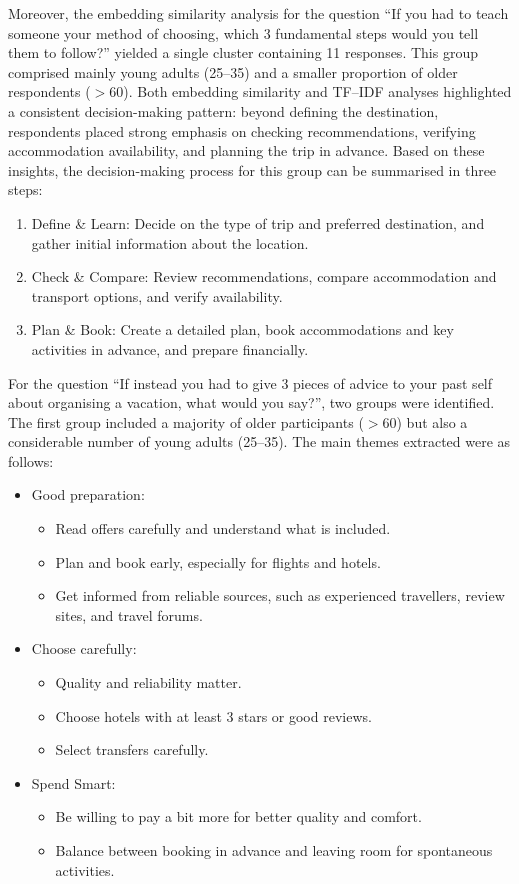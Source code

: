 \documentclass[a4paper, 12pt, twoside]{report}  %
\begin{document}
\indent Moreover, the embedding similarity analysis for the question “If you had to teach someone your method of choosing, which 3 fundamental steps would you tell them to follow?” yielded a single cluster containing 11 responses. This group comprised mainly young adults (25–35) and a smaller proportion of older respondents ($>60$). Both embedding similarity and TF–IDF analyses highlighted a consistent decision-making pattern: beyond defining the destination, respondents placed strong emphasis on checking recommendations, verifying accommodation availability, and planning the trip in advance. Based on these insights, the decision-making process for this group can be summarised in three steps:

\begin{enumerate}
    \item Define \& Learn: Decide on the type of trip and preferred destination, and gather initial information about the location.
    \item Check \& Compare: Review recommendations, compare accommodation and transport options, and verify availability.
    \item Plan \& Book: Create a detailed plan, book accommodations and key activities in advance, and prepare financially.
\end{enumerate}

\indent For the question “If instead you had to give 3 pieces of advice to your past self about organising a vacation, what would you say?”, two groups were identified. The first group included a majority of older participants ($>60$) but also a considerable number of young adults (25–35). The main themes extracted were as follows:

\begin{itemize}
    \item Good preparation:
    \begin{itemize}
        \item Read offers carefully and understand what is included.
        \item Plan and book early, especially for flights and hotels.
        \item Get informed from reliable sources, such as experienced travellers, review sites, and travel forums.
    \end{itemize}
    \item Choose carefully:
    \begin{itemize}
        \item Quality and reliability matter.
        \item Choose hotels with at least 3 stars or good reviews.
        \item Select transfers carefully.
    \end{itemize}
    \item Spend Smart:
    \begin{itemize}
        \item Be willing to pay a bit more for better quality and comfort.
        \item Balance between booking in advance and leaving room for spontaneous activities.
    \end{itemize}
\end{itemize}
\end{document}
